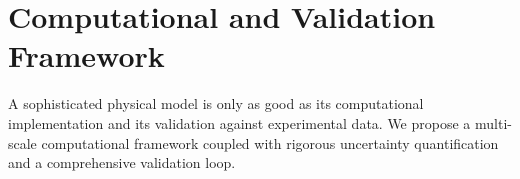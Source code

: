 \section{Computational and Validation Framework}
A sophisticated physical model is only as good as its computational implementation and its validation against experimental data. We propose a multi-scale computational framework coupled with rigorous uncertainty quantification and a comprehensive validation loop.




